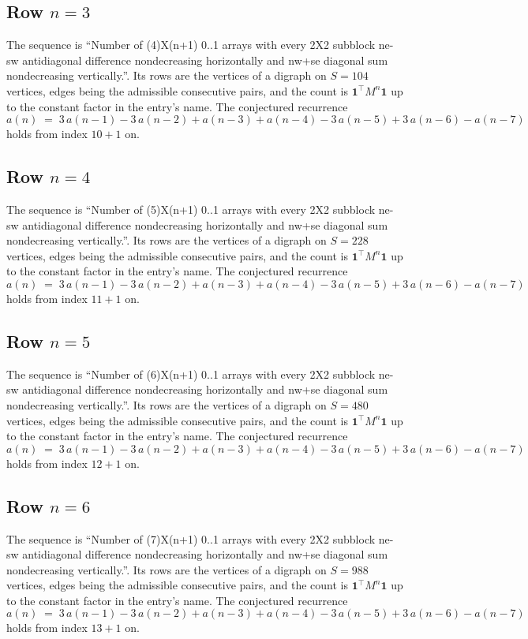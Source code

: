 \documentclass[11pt,a4paper]{article}
\theoremstyle{plain}
\theoremstyle{definition}
\begin{document}
\subsection*{Row $n$$=3$}
The sequence is ``Number of (4)X(n+1) 0..1 arrays with every 2X2 subblock ne-sw antidiagonal difference nondecreasing horizontally and nw+se diagonal sum nondecreasing vertically.''. Its rows are the vertices of a digraph on
$S=104$ vertices, edges being the admissible consecutive pairs, and the count is
$\mathbf{1}^{\!\top}M^{n}\mathbf{1}$ up to the constant factor in the entry's name.
The conjectured recurrence
\[
a(n)\;=\;3\,a(n-1) - 3\,a(n-2) + a(n-3) + a(n-4) - 3\,a(n-5) + 3\,a(n-6) - a(n-7)
\]
holds from index $10+1$ on.

\subsection*{Row $n$$=4$}
The sequence is ``Number of (5)X(n+1) 0..1 arrays with every 2X2 subblock ne-sw antidiagonal difference nondecreasing horizontally and nw+se diagonal sum nondecreasing vertically.''. Its rows are the vertices of a digraph on
$S=228$ vertices, edges being the admissible consecutive pairs, and the count is
$\mathbf{1}^{\!\top}M^{n}\mathbf{1}$ up to the constant factor in the entry's name.
The conjectured recurrence
\[
a(n)\;=\;3\,a(n-1) - 3\,a(n-2) + a(n-3) + a(n-4) - 3\,a(n-5) + 3\,a(n-6) - a(n-7)
\]
holds from index $11+1$ on.

\subsection*{Row $n$$=5$}
The sequence is ``Number of (6)X(n+1) 0..1 arrays with every 2X2 subblock ne-sw antidiagonal difference nondecreasing horizontally and nw+se diagonal sum nondecreasing vertically.''. Its rows are the vertices of a digraph on
$S=480$ vertices, edges being the admissible consecutive pairs, and the count is
$\mathbf{1}^{\!\top}M^{n}\mathbf{1}$ up to the constant factor in the entry's name.
The conjectured recurrence
\[
a(n)\;=\;3\,a(n-1) - 3\,a(n-2) + a(n-3) + a(n-4) - 3\,a(n-5) + 3\,a(n-6) - a(n-7)
\]
holds from index $12+1$ on.

\subsection*{Row $n$$=6$}
The sequence is ``Number of (7)X(n+1) 0..1 arrays with every 2X2 subblock ne-sw antidiagonal difference nondecreasing horizontally and nw+se diagonal sum nondecreasing vertically.''. Its rows are the vertices of a digraph on
$S=988$ vertices, edges being the admissible consecutive pairs, and the count is
$\mathbf{1}^{\!\top}M^{n}\mathbf{1}$ up to the constant factor in the entry's name.
The conjectured recurrence
\[
a(n)\;=\;3\,a(n-1) - 3\,a(n-2) + a(n-3) + a(n-4) - 3\,a(n-5) + 3\,a(n-6) - a(n-7)
\]
holds from index $13+1$ on.
\end{document}
